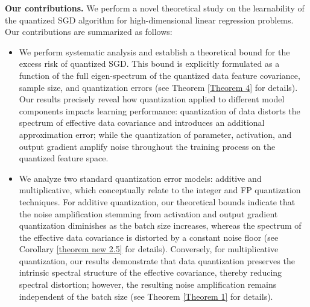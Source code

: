 \documentclass[11pt, letterpaper]{article}
\begin{document}

\textbf{Our contributions.} 
We perform a novel theoretical study on the learnability of the quantized SGD algorithm for high-dimensional linear regression problems. Our contributions are summarized as follows:

\begin{itemize}[leftmargin=*]
\item We perform systematic analysis and establish a theoretical bound for the excess risk of quantized SGD. This bound is explicitly formulated as a function of the full eigen-spectrum of the quantized data feature covariance, sample size, and quantization errors (see Theorem \ref{Theorem 4} for details). Our results precisely reveal how quantization applied to different model components impacts learning performance: quantization of data distorts the spectrum of effective data covariance and introduces an additional approximation error; while the quantization of parameter, activation, and output gradient amplify noise throughout the training process on the quantized feature space.

\item We analyze two standard quantization error models: additive and multiplicative, which conceptually relate to the integer and FP quantization techniques. For additive quantization, our theoretical bounds indicate that the noise amplification stemming from activation and output gradient quantization diminishes as the batch size increases, whereas the spectrum of the effective data covariance is distorted by a constant noise floor (see Corollary \ref{theorem new 2.5} for details). Conversely, for multiplicative quantization, our results demonstrate that data quantization preserves the intrinsic spectral structure of the effective covariance, thereby reducing spectral distortion; however, the resulting noise amplification remains independent of the batch size (see Theorem \ref{Theorem 1} for details).



\end{itemize}
\end{document}
